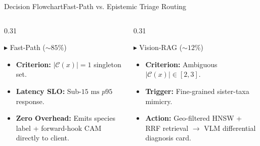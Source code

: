 \begin{frame}{Decision Flowchart}{Fast-Path vs. Epistemic Triage Routing}
\begin{center}
{
    }
    \end{center}

    \vspace{-0.20cm}
    \begin{columns}[T, totalwidth=\textwidth]
        \begin{column}{0.31\textwidth}
            \begin{block}{\scriptsize\textcolor{TaxonPrimary!90!black}{$\blacktriangleright$ Fast-Path ($\sim 85\%$)}}
                \begin{itemize}\tiny\setlength{\itemsep}{1pt}
                    \item \textbf{Criterion:} $|\mathcal{C}(x)| = 1$ singleton set.
                    \item \textbf{Latency SLO:} Sub-$15\text{ ms}$ $p95$ response.
                    \item \textbf{Zero Overhead:} Emits species label + forward-hook CAM directly to client.
                \end{itemize}
            \end{block}
        \end{column}

        \begin{column}{0.31\textwidth}
            \begin{block}{\scriptsize\textcolor{TaxonSecondary!90!black}{$\blacktriangleright$ Vision-RAG ($\sim 12\%$)}}
                \begin{itemize}\tiny\setlength{\itemsep}{1pt}
                    \item \textbf{Criterion:} Ambiguous $|\mathcal{C}(x)| \in [2, 3]$.
                    \item \textbf{Trigger:} Fine-grained sister-taxa mimicry.
                    \item \textbf{Action:} Geo-filtered HNSW + RRF retrieval $\to$ VLM differential diagnosis card.
                \end{itemize}
            \end{block}
        \end{column}


\end{columns}
\end{frame}
